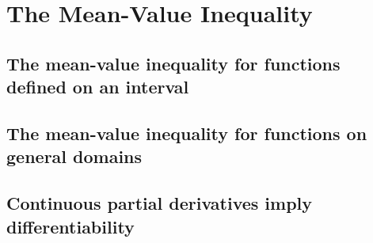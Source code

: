 \section{The Mean-Value Inequality}

\subsection{The mean-value inequality for functions defined on an interval}

\subsection{The mean-value inequality for functions on general domains}

\subsection{Continuous partial derivatives imply differentiability}
